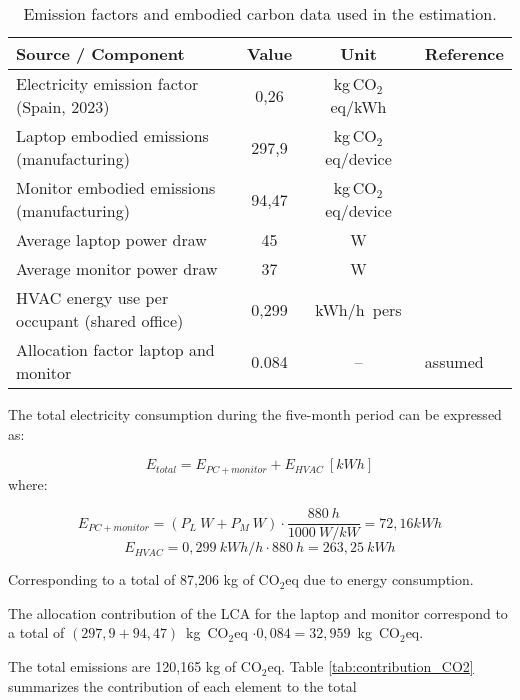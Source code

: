 \begin{table}[H]
\centering
\caption{Emission factors and embodied carbon data used in the estimation.}
\label{tab:co2_inputs_full}
\renewcommand{\arraystretch}{1.15}
\small
\begin{tabular}{|l|c|c|l|}
\hline
\textbf{Source / Component} & \textbf{Value} & \textbf{Unit} & \textbf{Reference} \\ 
\hline
Electricity emission factor (Spain, 2023) & 0,26 & kg\,CO$_2$eq/kWh & \cite{Gencat2023FactorsEmissio} \\ 
Laptop embodied emissions (manufacturing) & 297,9 & kg\,CO$_2$eq/device & \cite{CircularComputing2022} \\ 
Monitor embodied emissions (manufacturing) & 94,47 & kg\,CO$_2$eq/device & \cite{HP2021MonitorLCA} \\ 
Average laptop power draw & 45 & W & \cite{AsusVivabook} \\ 
Average monitor power draw & 37 & W & \cite{AOC} \\ 
HVAC energy use per occupant (shared office) & 0,299 & kWh/h~pers & \cite{ICAEN} \\ 
Allocation factor laptop and monitor & 0.084 & -- & assumed \\ 
\hline
\end{tabular}
\end{table}

The total electricity consumption during the five-month period can be expressed as:

\begin{equation}
E_{total} = E_{PC+monitor}  + E_{HVAC}~[kWh]
\end{equation}
where:

\begin{equation}
E_{PC+monitor} = (P_L~W + P_M ~W) \cdot  \frac{880~h}{1000~W/kW} = 72,16 kWh
\end{equation}
\begin{equation}
E_{HVAC} = 0,299~kWh/h \cdot 880~h = 263,25~kWh
\end{equation}

Corresponding to a total of 87,206 kg of CO$_2$eq due to energy consumption.

The allocation contribution of the LCA for the laptop and monitor correspond to a total of $(297,9 + 94,47)$~kg~CO$_2$eq $\cdot 0,084 = 32,959$~kg~CO$_2$eq.

The total emissions are 120,165 kg of CO$_2$eq. Table \ref{tab:contribution_CO2} summarizes the contribution of each element to the total 

